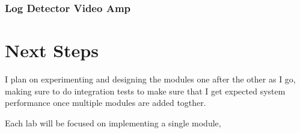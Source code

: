 \subsubsection{Log Detector Video Amp}

\section{Next Steps}

I plan on experimenting and designing the modules one after the other as I go,
making sure to do integration tests to make sure that I get expected system
performance once multiple modules are added togther.

Each lab will be focused on implementing a single module, 
